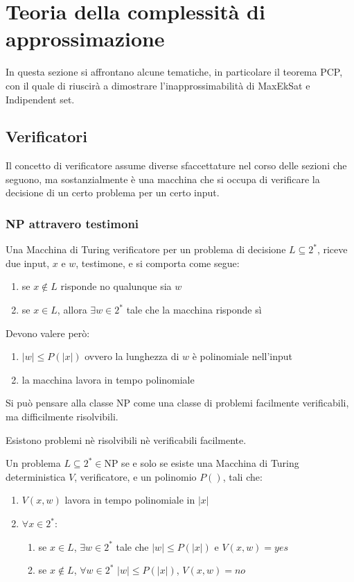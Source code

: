 \section{Teoria della complessità di approssimazione}

In questa sezione si affrontano alcune tematiche, in particolare il teorema PCP, 
con il quale di riuscirà a dimostrare l'inapprossimabilità di MaxEkSat e Indipendent set.

\subsection{Verificatori}
Il concetto di verificatore assume diverse sfaccettature nel corso 
delle sezioni che seguono, ma sostanzialmente è una macchina che si occupa di verificare 
la decisione di un certo problema per un certo input.

\subsubsection{NP attravero testimoni}
Una Macchina di Turing verificatore per un problema di decisione $L \subseteq 2^*$, riceve due input, $x$ e $w$, testimone, 
e si comporta come segue:
\begin{enumerate}
    \item se $x \notin L$ risponde no qualunque sia $w$
    \item se $x \in L$, allora $\exists w\in 2^*$ tale che la macchina risponde sì
\end{enumerate}
Devono valere però:
\begin{enumerate}
    \item $|w| \leq P(|x|)$ ovvero la lunghezza di $w$ è polinomiale nell'input
    \item la macchina lavora in tempo polinomiale
\end{enumerate}

\begin{remark}
    Si può pensare alla classe NP come una classe di problemi facilmente verificabili, ma difficilmente 
    risolvibili.
\end{remark}
\begin{remark}
    Esistono problemi nè risolvibili nè  verificabili facilmente.
\end{remark}
\begin{theorem}
    Un problema $L \subseteq 2^* \in $NP se e solo se esiste una Macchina di Turing deterministica $V$, verificatore,
    e un polinomio $P()$, tali che:
    \begin{enumerate}
        \item $V(x,w)$ lavora in tempo polinomiale in $|x|$
        \item $\forall x \in 2^*$:
        \begin{enumerate}
            \item se $x \in L$, $\exists w \in 2^*$ tale che $|w| \leq P(|x|)$ e $V(x,w) = \mathit{yes}$
            \item se $x \notin L$, $\forall w \in 2^*$ $|w| \leq P(|x|)$, $V(x,w) = \mathit{no}$
        \end{enumerate}
    \end{enumerate}
\end{theorem}

